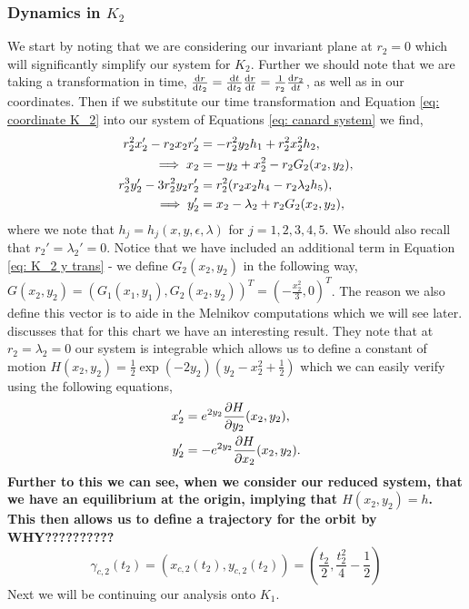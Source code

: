 \documentclass{article}
\begin{document}
\subsubsection{Dynamics in $K_2$}
We start by noting that we are considering our invariant plane at $r_2=0$ which will significantly simplify our system for $K_2$. Further we should note that we are taking a transformation in time, $\od{r}{t_2}=\od{t}{t_2}\od{r}{t}=\frac{1}{r_2}\od{r_2}{t}$, as well as in our coordinates. Then if we substitute our time transformation and Equation  \ref{eq: coordinate K_2} into our system of Equations \ref{eq: canard system} we find, 
\begin{subequations}
    \begin{align}
    r_2^2x_2' - r_2x_2r_2'&=-r_2^2y_2h_1+r^2_2x^2_2h_2,\notag\\
    \implies x_2&=-y_2+x_2^2-r_2G_2(x_2,y_2),\\
        r^3_2y_2'-3r_2^2y_2r_2'&=r^2_2(r_2x_2h_4-r_2\lambda_2h_5),\notag\\
        \implies y_2'&=x_2-\lambda_2+r_2G_2(x_2,y_2), \label{eq: K_2 y trans}
    \end{align}
\end{subequations}
where we note that $h_j=h_j(x,y,\epsilon,\lambda)$ for $j=1,2,3,4,5$. We should also recall that $r_2'=\lambda_2'=0$. Notice that we have included an additional term in Equation \ref{eq: K_2 y trans} - we define $G_2(x_2,y_2)$ in the following way, $G(x_2,y_2)=(G_1(x_1,y_1),G_2(x_2,y_2))^T=(-\frac{x^2_2}{3},0)^T$. The reason we also define this vector is to aide in the Melnikov computations which we will see later. \citet{krupa2001} discusses that for this chart we have an interesting result. They note that at $r_2=\lambda_2=0$ our system is integrable which allows us to define a constant of motion $H(x_2,y_2)=\frac{1}{2}\exp{(-2y_2)}\left(y_2-x^2_2+\frac{1}{2}\right)$ which we can easily verify \citep{krupa2001} using the following equations,
\begin{align*}
    x'_2&=e^{2y_2}\pd{H}{y_2}(x_2,y_2),\\
    y_2'&=-e^{2y_2}\pd{H}{x_2}(x_2,y_2).
\end{align*}
\textbf{Further to this we can see, when we consider our reduced system, that we have an equilibrium at the origin, implying that $H(x_2,y_2)=h$. This then allows us to define a trajectory for the orbit by\\
WHY??????????}
\begin{equation}
    \gamma_{c,2}(t_2)=(x_{c,2}(t_2),y_{c,2}(t_2))=\left(\frac{t_2}{2},\frac{t^2_2}{4}-\frac{1}{2}\right)    
\end{equation}
Next we will be continuing our analysis onto $K_1$.
\end{document}
